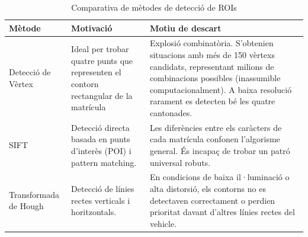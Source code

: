 \begin{table}[H]
    \centering
    \begin{tabular}{|p{4cm}|p{2.5cm}|p{6cm}|}
        \hline
        \textbf{Mètode} & \textbf{Motivació} & \textbf{Motiu de descart} \\
        \hline
        Detecció de Vèrtex & Ideal per trobar quatre punts que representen el contorn rectangular de la matrícula & Explosió combinatòria. S'obtenien situacions amb més de 150 vèrtexs candidats, representant milions de combinacions possibles (inassumible computacionalment). A baixa resolució rarament es detecten bé les quatre cantonades.\\
        \hline
        SIFT & Detecció directa basada en punts d'interès (POI) i pattern matching. & Les diferències entre els caràcters de cada matrícula confonen l'algorisme general. És incapaç de trobar un patró universal robuts. \\
        \hline
        Transformada de Hough & Detecció de línies rectes verticals i horitzontals. & En condicions de baixa il·luminació o alta distorsió, els contorns no es detectaven correctament o perdien prioritat davant d'altres línies rectes del vehicle. \\
        \hline
    \end{tabular}
    \caption{Comparativa de mètodes de detecció de ROIs}
    \label{tab:preproc_ROI}
\end{table}